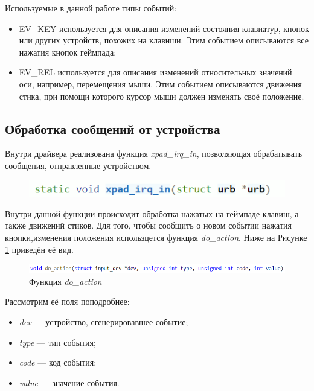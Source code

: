 Используемые в данной работе типы событий:
\begin{itemize}
	\item EV\_KEY используется для описания изменений состояния клавиатур,
	 кнопок или других устройств, похожих на клавиши. Этим событием описываются все нажатия кнопок геймпада;
	\item EV\_REL используется для описания изменений относительных значений оси, например, перемещения мыши.
	Этим событием описываются движения стика, при помощи которого курсор мыши должен изменять своё положение.
\end{itemize}\par


\subsection{Обработка сообщений от устройства}
Внутри драйвера реализована функция \textit{xpad\_irq\_in},
позволяющая обрабатывать сообщения, отправленные устройством.
\begin{figure}[h!]
	\centering
	\includegraphics[scale=1]{img/xpad-irq-in.png}
\end{figure}\par
Внутри данной функции происходит обработка нажатых на геймпаде клавиш, а также движений стиков.
Для того, чтобы сообщить о новом событии нажатия кнопки,изменения положения использцется функция \textit{do\_action}.
Ниже на Рисунке \ref{input_report} приведён её вид.

\begin{figure}[h!]
	\centering
	\includegraphics[scale=0.9]{img/action-naming.png}
	\caption{Функция \textit{do\_action}}
	\label{input_report}
\end{figure}\par

Рассмотрим её поля поподробнее:
\begin{itemize}
	\item \textit{dev} --- устройство, сгенерировавшее событие;
	\item \textit{type} --- тип события;
	\item \textit{code} --- код события;
	\item \textit{value} --- значение события.
\end{itemize}\par

